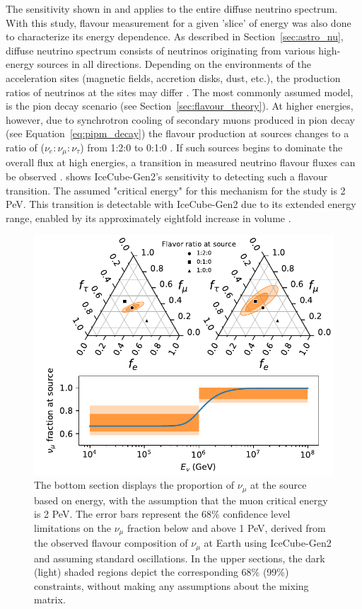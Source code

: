 The sensitivity shown in  and applies to the entire diffuse neutrino spectrum. With this study, flavour measurement for a given 'slice' of energy was also done to characterize its energy dependence. As described in Section~\ref{sec:astro_nu}, diffuse neutrino spectrum consists of neutrinos originating from various high-energy sources in all directions. Depending on the environments of the acceleration sites (magnetic fields, accretion disks, dust, etc.), the production ratios of neutrinos at the sites may differ . The most commonly assumed model, is the pion decay scenario (see Section~\ref{sec:flavour_theory}). At higher energies, however, due to synchrotron cooling of secondary muons produced in pion decay (see Equation~\ref{eq:pipm_decay}) the flavour production at sources changes to a ratio of ($\nu_e:\nu_{\mu}:\nu_{\tau}$) from 1:2:0 to 0:1:0 . If such sources begins to dominate the overall flux at high energies, a transition in measured neutrino flavour fluxes can be observed .  shows IceCube-Gen2's sensitivity to detecting such a flavour transition. The assumed "critical energy" for this mechanism for the study is 2 PeV. This transition is detectable with IceCube-Gen2 due to its extended energy range, enabled by its approximately eightfold increase in volume .

\begin{figure}[h!]
\centering
    \includegraphics{./figures/gen2/MuonDamped.pdf}
    \caption[Sensitivity of IceCube-Gen2 to measure an energy dependent flavour composition of Astrophysical neutrino]{The bottom section displays the proportion of $\nu_{\mu}$ at the source based on energy, with the assumption that the muon critical energy is 2 PeV. The error bars represent the 68\% confidence level limitations on the $\nu_{\mu}$ fraction below and above 1 PeV, derived from the observed flavour composition of $\nu_{\mu}$ at Earth using IceCube-Gen2 and assuming standard oscillations. In the upper sections, the dark (light) shaded regions depict the corresponding 68\% (99\%) constraints, without making any assumptions about the mixing matrix.}
\end{figure}


